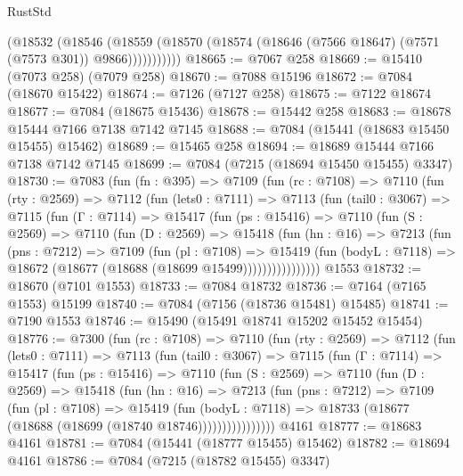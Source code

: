 \begin{lexlean}{RustStd}
\begin{coremodule}
              (@18532
                (@18546
                  (@18559
                    (@18570 (@18574 (@18646 (@7566 @18647) (@7571 (@7573 @301)) @9866)))))))))))
@18665 := @7067 @258
@18669 := @15410 (@7073 @258) (@7079 @258)
@18670 := @7088 @15196
@18672 := @7084 (@18670 @15422)
@18674 := @7126 (@7127 @258)
@18675 := @7122 @18674
@18677 := @7084 (@18675 @15436)
@18678 := @15442 @258
@18683 := @18678 @15444 @7166 @7138 @7142 @7145
@18688 := @7084 (@15441 (@18683 @15450 @15455) @15462)
@18689 := @15465 @258
@18694 := @18689 @15444 @7166 @7138 @7142 @7145
@18699 := @7084 (@7215 (@18694 @15450 @15455) @3347)
@18730 := @7083
    (fun (fn : @395) =>
    @7109
      (fun (rc : @7108) =>
      @7110
        (fun (rty : @2569) =>
        @7112
          (fun (lets0 : @7111) =>
          @7113
            (fun (tail0 : @3067) =>
            @7115
              (fun (Γ : @7114) =>
              @15417
                (fun (ps : @15416) =>
                @7110
                  (fun (S : @2569) =>
                  @7110
                    (fun (D : @2569) =>
                    @15418
                      (fun (hn : @16) =>
                      @7213
                        (fun (pns : @7212) =>
                        @7109
                          (fun (pl : @7108) =>
                          @15419
                            (fun (bodyL : @7118) =>
                            @18672 (@18677 (@18688 (@18699 @15499))))))))))))))))
    @1553
@18732 := @18670 (@7101 @1553)
@18733 := @7084 @18732
@18736 := @7164 (@7165 @1553) @15199
@18740 := @7084 (@7156 (@18736 @15481) @15485)
@18741 := @7190 @1553
@18746 := @15490 (@15491 @18741 @15202 @15452 @15454)
@18776 := @7300
    (fun (rc : @7108) =>
    @7110
      (fun (rty : @2569) =>
      @7112
        (fun (lets0 : @7111) =>
        @7113
          (fun (tail0 : @3067) =>
          @7115
            (fun (Γ : @7114) =>
            @15417
              (fun (ps : @15416) =>
              @7110
                (fun (S : @2569) =>
                @7110
                  (fun (D : @2569) =>
                  @15418
                    (fun (hn : @16) =>
                    @7213
                      (fun (pns : @7212) =>
                      @7109
                        (fun (pl : @7108) =>
                        @15419
                          (fun (bodyL : @7118) =>
                          @18733 (@18677 (@18688 (@18699 (@18740 @18746))))))))))))))))
    @4161
@18777 := @18683 @4161
@18781 := @7084 (@15441 (@18777 @15455) @15462)
@18782 := @18694 @4161
@18786 := @7084 (@7215 (@18782 @15455) @3347)

\end{coremodule}
\end{lexlean}
